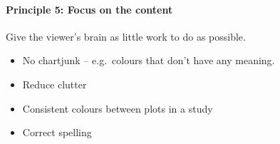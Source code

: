\documentclass[10pt]{article}
\begin{document}
\begin{multicols}{3}
\paragraph{Principle 5:  Focus on the content}

Give the viewer's brain as little work to do as possible.
\begin{itemize}
\item No chartjunk -- e.g.~colours that don't have any meaning.
\item Reduce clutter
\item Consistent colours between plots in a study
\item Correct spelling
\end{itemize}




\end{multicols}
\end{document}
